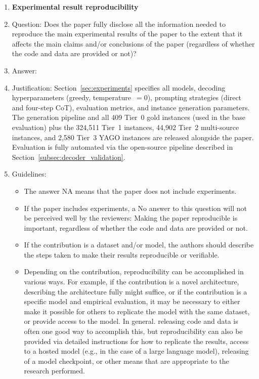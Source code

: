 \documentclass{article}
\theoremstyle{definition}
\begin{document}
\begin{enumerate}
    \item {\bf Experimental result reproducibility}
    \item[] Question: Does the paper fully disclose all the information needed to reproduce the main experimental results of the paper to the extent that it affects the main claims and/or conclusions of the paper (regardless of whether the code and data are provided or not)?
    \item[] Answer: \answerYes{}
    \item[] Justification: Section~\ref{sec:experiments} specifies all models, decoding hyperparameters (greedy, temperature~$=0$), prompting strategies (direct and four-step CoT), evaluation metrics, and instance generation parameters. The generation pipeline and all 409 Tier~0 gold instances (used in the base evaluation) plus the 324,511 Tier~1 instances, 44,902 Tier~2 multi-source instances, and 2,580 Tier~3 YAGO instances are released alongside the paper. Evaluation is fully automated via the open-source pipeline described in Section~\ref{subsec:decoder_validation}.
    \item[] Guidelines:
    \begin{itemize}
        \item The answer NA means that the paper does not include experiments.
        \item If the paper includes experiments, a No answer to this question will not be perceived well by the reviewers: Making the paper reproducible is important, regardless of whether the code and data are provided or not.
        \item If the contribution is a dataset and/or model, the authors should describe the steps taken to make their results reproducible or verifiable. 
        \item Depending on the contribution, reproducibility can be accomplished in various ways. For example, if the contribution is a novel architecture, describing the architecture fully might suffice, or if the contribution is a specific model and empirical evaluation, it may be necessary to either make it possible for others to replicate the model with the same dataset, or provide access to the model. In general. releasing code and data is often one good way to accomplish this, but reproducibility can also be provided via detailed instructions for how to replicate the results, access to a hosted model (e.g., in the case of a large language model), releasing of a model checkpoint, or other means that are appropriate to the research performed.

\end{itemize}
\end{enumerate}
\end{document}
